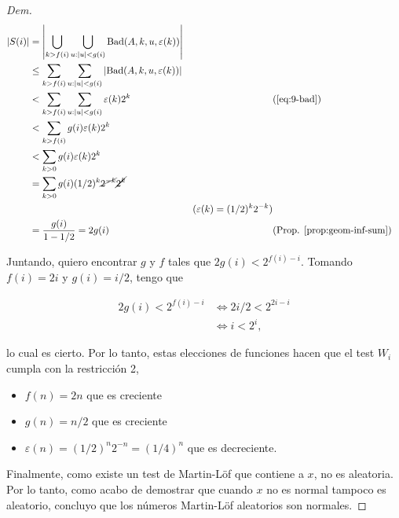 \documentclass{article}
\theoremstyle{definition} %
\newcommand{\size}[1]{\left|#1\right|}
\newcommand{\ML}{Martin-Löf }
\newcommand{\Bad}[4]{\text{Bad}(#1, #2, #3, #4)}
\begin{document}
\begin{proof}[Dem]
    \begin{align*}
        \size{S(i)}
            &= \size{
                \bigcup_{k > f(i)} 
                \bigcup_{u : |u| < g(i)}
                \Bad{A}{k}{u}{\varepsilon(k)}
            }\\
            &\leq 
                \sum_{k > f(i)} 
                \sum_{u : |u| < g(i)}
                \size{\Bad{A}{k}{u}{\varepsilon(k)}}\\
            &<
                \sum_{k > f(i)} 
                \sum_{u : |u| < g(i)}
                    \varepsilon(k) 2^k
            &&(\text{\ref{eq:9-bad}})\\
            &<
                \sum_{k > f(i)} 
                    g(i)
                    \varepsilon(k) 2^k\\
            &< \sum_{k > 0} 
                    g(i)
                    \varepsilon(k) 2^k\\
            &= \sum_{k > 0} 
                g(i)
                (1/2)^k \cancel{2^{-k}} \cancel{2^k}\\
            &&(\varepsilon(k) = (1/2)^k 2^{-k})\\
            &= \frac
                {g(i)}
                {1 - 1/2}
            = 2g(i)
            &&\text{(Prop. \ref{prop:geom-inf-sum})}
    \end{align*}

    Juntando, quiero encontrar $g$ y $f$ tales que $2g(i) < 2^{f(i)- i}$.
    Tomando $f(i) = 2i$ y $g(i) = i/2$, tengo que

    \begin{align*}
        2g(i) < 2^{f(i)- i}
            &\iff 2 i/2 < 2^{2i - i} \\
            &\iff i < 2^{i},
    \end{align*}

    lo cual es cierto. Por lo tanto, estas elecciones de funciones hacen que el
    test $W_i$ cumpla con la restricción 2,
    
    \begin{itemize}
        \item $f(n) = 2n$ que es creciente
        \item $g(n) = n/2$ que es creciente
        \item $\varepsilon(n) = (1/2)^n 2^{-n} = (1/4)^n$ que es decreciente.
    \end{itemize}

    Finalmente, como existe un test de \ML que contiene a $x$, no es aleatoria.
    Por lo tanto, como acabo de demostrar que cuando $x$ no es normal tampoco es
    aleatorio, concluyo que los números \ML aleatorios son normales.
\end{proof}
\end{document}
